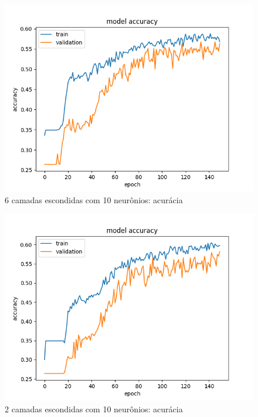 \documentclass[11pt]{article}
\begin{document}
\begin{figure}
	\includegraphics[width=\linewidth]{exp/Figure_6.png}
	\caption{6 camadas escondidas com 10 neurônios: acurácia}
	\label{fig:f4}
\end{figure}
\begin{figure}
	\includegraphics[width=\linewidth]{exp/Figure_5.png}
	\caption{2 camadas escondidas com 10 neurônios: acurácia}
	\label{fig:f4}
\end{figure}
\end{document}
